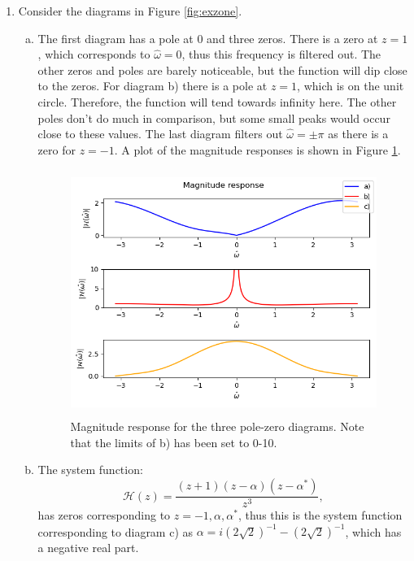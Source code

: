 \begin{enumerate}
    \item Consider the diagrams in Figure \ref{fig:exzone}.
          \begin{enumerate}[a)]
              \item The first diagram has a pole at $0$ and three zeros.
                    There is a zero at $z=1$, which corresponds to $\hat{\omega}=0$, thus this frequency is filtered out.
                    The other zeros and poles are barely noticeable, but the function will dip close to the zeros.
                    For diagram b) there is a pole at $z=1$, which is on the unit circle.
                    Therefore, the function will tend towards infinity here. The other poles don't do much in comparison,
                    but some small peaks would occur close to these values.
                    The last diagram filters out $\hat{\omega}=\pm\pi$ as there is a zero for $z=-1$.
                    A plot of the magnitude responses is shown in Figure \ref{fig:mag_res_diag}.

                    \begin{figure}
                        \centering
                        \includegraphics[width=10.5cm, height=8.0cm]{ch19/figures/magn_resp_diag.png}
                        \caption{Magnitude response for the three pole-zero diagrams. Note that the limits of b) has been set to 0-10.}
                        \label{fig:mag_res_diag}
                    \end{figure}

              \item The system function:
                    \[\mathcal{H}(z)=\frac{(z + 1)(z - \alpha)(z - \alpha^{*})}{z^{3}},\]
                    has zeros corresponding to $z = -1,\alpha,\alpha^{*}$, thus this is the system function
                    corresponding to diagram c) as $\alpha = i(2\sqrt{2})^{-1} - (2\sqrt{2})^{-1}$, which has a negative real part.


\end{enumerate}
\end{enumerate}
